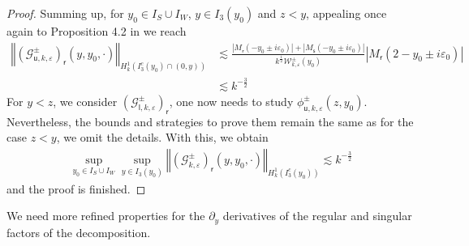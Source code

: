 \documentclass[11pt,reqno]{amsproc}
\theoremstyle{definition}
\numberwithin{equation}{section}
\newcommand{\G}{{\mathcal{G}}}
\newcommand{\sr}{{\mathsf{r}}}
\newcommand{\s}{{\mathsf{s}}}
\newcommand{\su}{{\mathsf{u}}}
\renewcommand{\sl}{{\mathsf{l}}}
\newcommand{\W}{{\mathcal{W}}}
\newcommand{\ep}{\varepsilon}
\begin{document}
\begin{proof}
Summing up, for $y_0\in I_S \cup I_W$, $y\in I_3(y_0)$ and $z < y$, appealing once again to Proposition 4.2 in \cite{CZN25chan} we reach
\begin{align*}
 \left\Vert \left( \G_{\su,k,\ep}^\pm\right)_{\sr}(y,y_0,\cdot) \right\Vert_{H^1_k(I_3^c(y_0)\cap(0, y))} &\lesssim \frac{|M_\sr(-y_0 \pm i\ep_0)| + |M_\s( - y_0\pm i\ep_0)|}{k^\frac12\W_{k,\ep}^\pm(y_0)}| M_\sr(2 - y_0 \pm i\ep_0) | \\
 &\lesssim k^{-\frac32}
\end{align*}
For $y < z$, we consider $\left( \G_{\sl,k,\ep}^\pm\right)_{\sr}$, one now needs to study $\phi_{\su,k,\ep}^\pm(z,y_0)$. Nevertheless, the bounds and strategies to prove them remain the same as for the case $z<y$, we omit the details. With this, we obtain
\begin{align*}
\sup_{y_0\in I_S\cup I_W}\sup_{y\in I_3(y_0)} \left\Vert \left( \G_{k,\ep}^\pm\right)_{\sr}(y,y_0,\cdot) \right\Vert_{H^1_k(I_3^c(y_0))} \lesssim k^{-\frac32}
\end{align*}
and the proof is finished.
\end{proof}

We need more refined properties for the $\partial_y$ derivatives of the regular and singular factors of the decomposition.
\end{document}
